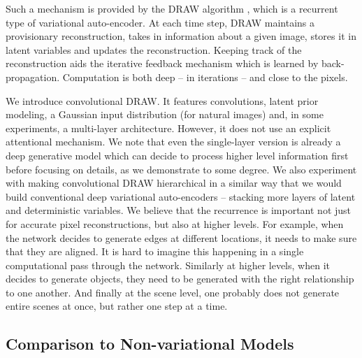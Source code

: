 \documentclass{article}
\begin{document}
Such a mechanism is provided by the DRAW algorithm \citep{gregor2015draw}, which is a recurrent type of variational auto-encoder. At each time step, DRAW maintains a provisionary reconstruction, takes in information about a given image, stores it in latent variables and updates the reconstruction. Keeping track of the reconstruction aids the iterative feedback mechanism which is learned by back-propagation. Computation is both deep -- in iterations -- and close to the pixels. 

We introduce convolutional DRAW. It features convolutions, latent prior modeling, a Gaussian input distribution (for natural images) and, in some experiments, a multi-layer architecture. However, it does not use an explicit attentional mechanism. We note that even the single-layer version is already a deep generative model which can decide to process higher level information first before focusing on details, as we demonstrate to some degree. We also experiment with making convolutional DRAW hierarchical in a similar way that we would build conventional deep variational auto-encoders \citep{gregor2013deep} --  stacking more layers of latent and deterministic variables. We believe that the recurrence is important not just for accurate pixel reconstructions, but also at higher levels. For example, when the network decides to generate edges at different locations, it needs to make sure that they are aligned. It is hard to imagine this happening in a single computational pass through the network. Similarly at higher levels, when it decides to generate objects, they need to be generated with the right relationship to one another. And finally at the scene level, one probably does not generate entire scenes at once, but rather one step at a time.







\subsection{Comparison to Non-variational Models}
\end{document}
